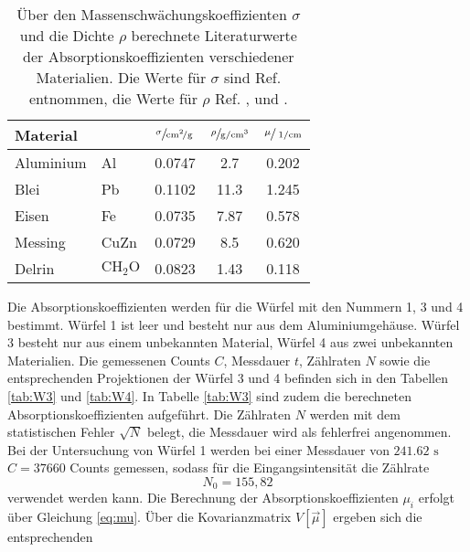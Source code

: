 \begin{table}[h]
    \centering
    \caption{Über den Massenschwächungskoeffizienten $\sigma$ und die Dichte $\rho$ berechnete Literaturwerte der 
    Absorptionskoeffizienten verschiedener Materialien. Die Werte für $\sigma$ sind Ref. \cite{xcom} entnommen, die Werte für 
    $\rho$ Ref. \cite{rsc}, \cite{delrin} und \cite{chemie}.}
    \label{tab:literatur}
    \begin{tabular}{l l S[table-format=1.4] S[table-format=2.2] S[table-format=1.3]}
        \toprule
        {Material} & {} & {$\sfrac{\sigma}{\si{\centi\meter\squared\per\gram}}$} & {$\sfrac{\rho}{\si{\gram\per\cubic\centi\meter}}$} & {$\sfrac{\mu}{\ \si{\per\centi\meter}}$}\\
        \midrule
        {Aluminium} & {Al}                    & 0.0747 & 2.7  & 0.202 \\
        {Blei}      & {Pb}                    & 0.1102 & 11.3 & 1.245 \\
        {Eisen}     & {Fe}                    & 0.0735 & 7.87 & 0.578 \\
        {Messing}   & {CuZn}                  & 0.0729 & 8.5  & 0.620 \\
        {Delrin}    & {$\text{CH}_2\text{O}$} & 0.0823 & 1.43 & 0.118 \\
        \bottomrule
    \end{tabular}
\end{table}
\FloatBarrier
\noindent
Die Absorptionskoeffizienten werden für die Würfel mit den Nummern 1, 3 und 4 bestimmt. Würfel 1 ist leer und besteht nur aus dem Aluminiumgehäuse.
Würfel 3 besteht nur aus einem unbekannten Material, Würfel 4 aus zwei unbekannten Materialien. 
Die gemessenen Counts $C$, Messdauer $t$, Zählraten $N$ sowie die entsprechenden Projektionen der Würfel 3 und 4 
befinden sich in den Tabellen \ref{tab:W3} und \ref{tab:W4}. In Tabelle \ref{tab:W3} sind zudem die berechneten Absorptionskoeffizienten
aufgeführt. Die Zählraten $N$ werden mit dem statistischen Fehler $\sqrt{N}$
belegt, die Messdauer wird als fehlerfrei angenommen.
Bei der Untersuchung von Würfel 1 werden bei einer Messdauer von $241.62 \text{ s}$ $C = 37660$
Counts gemessen, sodass für die Eingangsintensität die Zählrate
\begin{equation*}
    N_0 = 155,82
\end{equation*}
verwendet werden kann.
Die Berechnung der Absorptionskoeffizienten $\mu_i$ erfolgt über Gleichung \ref{eq:mu}. Über die Kovarianzmatrix $V[\vec{\mu}]$ ergeben sich die entsprechenden 
